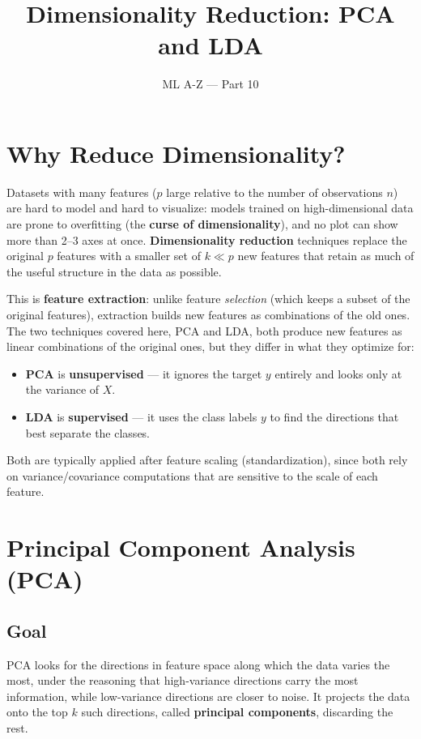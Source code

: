 \documentclass[11pt]{article}
\title{Dimensionality Reduction: PCA and LDA}
\author{ML A-Z --- Part 10}
\date{}
\begin{document}
\maketitle

\section{Why Reduce Dimensionality?}

Datasets with many features ($p$ large relative to the number of
observations $n$) are hard to model and hard to visualize: models trained
on high-dimensional data are prone to overfitting (the \textbf{curse of
dimensionality}), and no plot can show more than 2--3 axes at once.
\textbf{Dimensionality reduction} techniques replace the original $p$
features with a smaller set of $k \ll p$ new features that retain as much
of the useful structure in the data as possible.

This is \textbf{feature extraction}: unlike feature \emph{selection}
(which keeps a subset of the original features), extraction builds new
features as combinations of the old ones. The two techniques covered here,
PCA and LDA, both produce new features as linear combinations of the
original ones, but they differ in what they optimize for:

\begin{itemize}
  \item \textbf{PCA} is \textbf{unsupervised} --- it ignores the target
        $y$ entirely and looks only at the variance of $X$.
  \item \textbf{LDA} is \textbf{supervised} --- it uses the class labels
        $y$ to find the directions that best separate the classes.
\end{itemize}

Both are typically applied after feature scaling (standardization), since
both rely on variance/covariance computations that are sensitive to the
scale of each feature.

\section{Principal Component Analysis (PCA)}

\subsection{Goal}

PCA looks for the directions in feature space along which the data varies
the most, under the reasoning that high-variance directions carry the most
information, while low-variance directions are closer to noise. It
projects the data onto the top $k$ such directions, called \textbf{principal
components}, discarding the rest.
\end{document}
